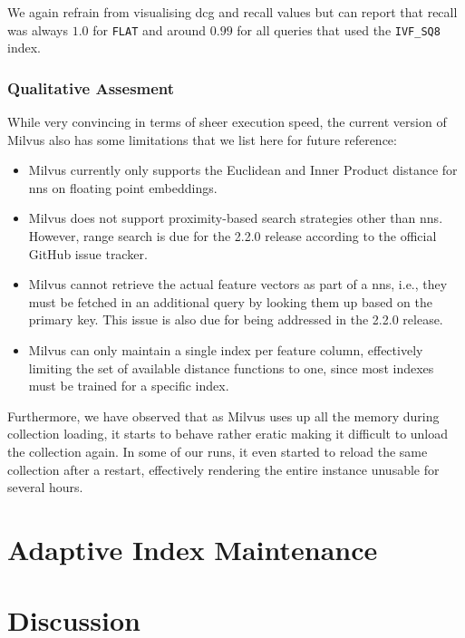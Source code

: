 We again refrain from visualising \acrshort{dcg} and recall values but can report that recall was always $1.0$ for \texttt{FLAT} and around $0.99$ for all queries that used the \texttt{IVF\_SQ8} index.

\subsubsection{Qualitative Assesment}
While very convincing in terms of sheer execution speed, the current version of Milvus also has some limitations that we list here for future reference:

\begin{itemize}
    \item Milvus currently only supports the Euclidean and Inner Product distance for \acrshort{nns} on floating point embeddings.
    \item Milvus does not support proximity-based search strategies other than \acrshort{nns}. However, range search is due for the 2.2.0 release according to the official GitHub issue tracker.
    \item Milvus cannot retrieve the actual feature vectors as part of a \acrshort{nns}, i.e., they must be fetched in an additional query by looking them up based on the primary key. This issue is also due for being addressed in the 2.2.0 release.
    \item Milvus can only maintain a single index per feature column, effectively limiting the set of available distance functions to one, since most indexes must be trained for a specific index.
\end{itemize}

Furthermore, we have observed that as Milvus uses up all the memory during collection loading, it starts to behave rather eratic making it difficult to unload the collection again. In some of our runs, it even started to reload the same collection after a restart, effectively rendering the entire instance unusable for several hours.

\section{Adaptive Index Maintenance}
\label{section:evaluation_adaptive_index_maintenance}


\section{Discussion}
\label{section:discussion}

